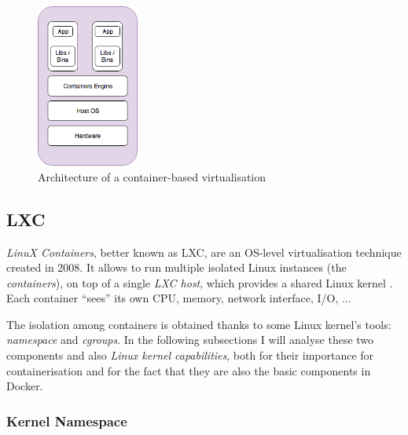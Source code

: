 \documentclass[a4paper,12pt]{article}
\begin{document}
\begin{figure}[ht!]
  \centerline{\includegraphics[width=0.3\textwidth]{container_architecture.png}}
  \caption{Architecture of a container-based virtualisation}
  \label{fig:container_architecture}
  \end{figure}


\subsection{LXC}

\textit{LinuX Containers}, better known as LXC, are an OS-level virtualisation
technique created in 2008. It allows to run multiple isolated Linux instances
(the \textit{containers}), on top of a single \textit{LXC host}, which provides
a shared Linux kernel \cite{wikipedia_LXC}. Each container ``sees'' its own CPU,
memory, network interface, I/O, ... \par The isolation among containers is
obtained thanks to some Linux kernel's tools: \textit{namespace} and
\textit{cgroups}. In the following subsections I will analyse these two
components and also \textit{Linux kernel capabilities}, both for their
importance for containerisation and for the fact that they are also the basic
components in Docker.

\subsubsection{Kernel Namespace}
\end{document}
